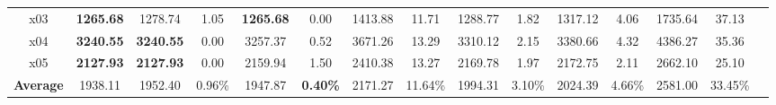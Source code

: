 \begin{table}[h]
{\begin{tabular}{ccccccccccccccc}
				x03 & \textbf{1265.68} & 1278.74 & 1.05 & \textbf{1265.68} & 0.00 & 1413.88 & 11.71 & 1288.77 & 1.82 & 1317.12 & 4.06 & 1735.64 & 37.13 \\
			
				x04 & \textbf{3240.55} & \textbf{3240.55} & 0.00 & 3257.37 & 0.52 & 3671.26 & 13.29 & 3310.12 & 2.15 & 3380.66 & 4.32 & 4386.27 & 35.36 \\
				
				x05 & \textbf{2127.93} & \textbf{2127.93} & 0.00 & 2159.94 & 1.50 & 2410.38 & 13.27 & 2169.78 & 1.97 & 2172.75 & 2.11 & 2662.10 & 25.10 \\
				\midrule
				\textbf{Average} & 1938.11 & 1952.40 & 0.96\% & 1947.87 & \textbf{0.40\%} & 2171.27 & 11.64\% & 1994.31 & 3.10\% & 2024.39 & 4.66\% & 2581.00 & 33.45\% \\
				\bottomrule 
			\end{tabular}
		}
	
		\label{tab:comparisonkmeans}
	\end{table}